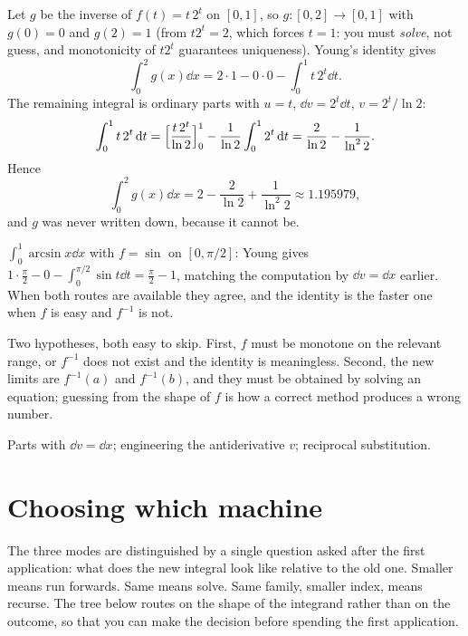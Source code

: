 \begin{worked}
Let $g$ be the inverse of $f(t)=t\,2^{t}$ on $[0,1]$, so $g:[0,2]\to[0,1]$ with $g(0)=0$ and $g(2)=1$ (from $t2^{t}=2$, which forces $t=1$: you must \emph{solve}, not guess, and monotonicity of $t2^{t}$ guarantees uniqueness). Young's identity gives
\[\int_0^{2}g(x)\dd x=2\cdot1-0\cdot0-\int_0^1t\,2^{t}\dd t.\]
The remaining integral is ordinary parts with $u=t$, $\dd v=2^{t}\dd t$, $v=2^{t}/\ln2$:
\[\int_0^1t\,2^{t}\,\mathrm{d} t=\Bigl[\frac{t\,2^{t}}{\ln2}\Bigr]_0^1-\frac{1}{\ln2}\int_0^12^{t}\,\mathrm{d} t=\frac{2}{\ln2}-\frac{1}{\ln^{2}2}.\]
Hence
\[\int_0^{2}g(x)\dd x=2-\frac{2}{\ln2}+\frac{1}{\ln^{2}2}\approx1.195979,\]
and $g$ was never written down, because it cannot be.
\end{worked}

\begin{worked}
$\int_0^1\arcsin x\dd x$ with $f=\sin$ on $[0,\pi/2]$: Young gives $1\cdot\tfrac{\pi}{2}-0-\int_0^{\pi/2}\sin t\dd t=\tfrac{\pi}{2}-1$, matching the computation by $\dd v=\dd x$ earlier. When both routes are available they agree, and the identity is the faster one when $f$ is easy and $f^{-1}$ is not.
\end{worked}

\begin{trap}
Two hypotheses, both easy to skip. First, $f$ must be monotone on the relevant range, or $f^{-1}$ does not exist and the identity is meaningless. Second, the new limits are $f^{-1}(a)$ and $f^{-1}(b)$, and they must be obtained by solving an equation; guessing from the shape of $f$ is how a correct method produces a wrong number.
\end{trap}

\begin{seealsob}Parts with $\dd v=\dd x$; engineering the antiderivative $v$; reciprocal substitution.\end{seealsob}

\section{Choosing which machine}

The three modes are distinguished by a single question asked after the first application: what does the new integral look like relative to the old one. Smaller means run forwards. Same means solve. Same family, smaller index, means recurse. The tree below routes on the shape of the integrand rather than on the outcome, so that you can make the decision before spending the first application.

